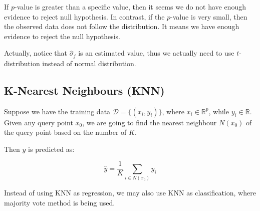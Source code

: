 \documentclass{article}
\theoremstyle{MyNonumberplain}
\theoremstyle{break}
\theoremstyle{break}
\begin{document}
If $p$-value is greater than a specific value, then it seems we do not have enough evidence to reject null hypothesis. 
In contrast, if the $p$-value is very small, then the observed data does not follow the distribution. It means we have enough evidence to 
reject the null hypothesis.

Actually, notice that $\hat\sigma_j$ is an estimated value, thus we actually need to use $t$-distribution instead of normal distribution.

\subsection{K-Nearest Neighbours (KNN)}

Suppose we have the training data $\mathcal{D}=\bigl\{(x_i,y_i)\bigr\}$, where $x_i\in\mathbb{R}^p$, while $y_i\in\mathbb{R}$.
Given any query point $x_0$, we are going to find the nearest neighbour $N(x_0)$ of the query point based on the number of $K$.

\begin{center}
\end{center}

Then $\hat y$ is predicted as:

$$
\hat y=\frac{1}{K}\sum_{i\in N(x_0)}y_i
$$

Instead of using KNN as regression, we may also use KNN as classification, where majority vote method is being used.
\end{document}
